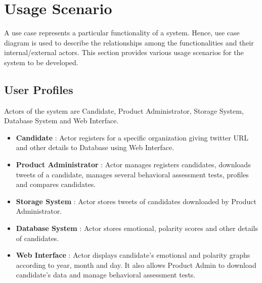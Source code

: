 \documentclass[oneside,a4paper,12pt]{pictreport}
\begin{document}
\section{Usage Scenario}
A use case represents a particular functionality of a system. Hence, use case diagram is used to describe the relationships among the functionalities and their internal/external actors. This section provides various usage scenarios for the system to be developed.

\subsection{User Profiles}
Actors of the system are Candidate, Product Administrator, Storage System, Database System and Web Interface.
\begin{itemize}
    \item \textbf{Candidate} : Actor registers for a specific organization giving twitter URL and other details to Database using Web Interface.
    \item \textbf{Product Administrator} : Actor manages registers candidates, downloads tweets of a candidate, manages several behavioral assessment tests, profiles and compares candidates.
    \item \textbf{Storage System} : Actor stores tweets of candidates downloaded by Product Administrator.
    \item \textbf{Database System} : Actor stores emotional, polarity scores and other details of candidates.
    \item \textbf{Web Interface} : Actor displays candidate's emotional and polarity graphs according to year, month and day. It also allows Product Admin to download candidate's data and manage behavioral assessment tests.  
\end{itemize}
\newpage
\end{document}
